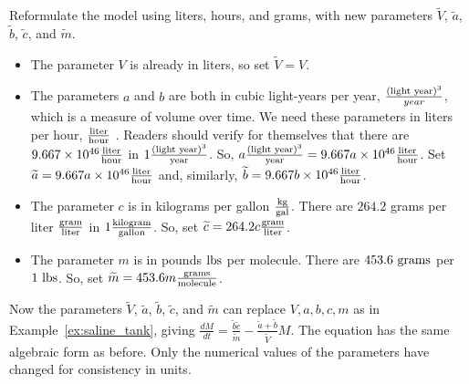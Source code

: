 \begin{example}
Reformulate the model using liters, hours, and grams, with new parameters $\widetilde{V}$, $\widetilde{a}$, $\widetilde{b}$, $\widetilde{c}$, and $\widetilde{m}$.
\begin{itemize}
\item The parameter $V$ is already in liters, so set $\widetilde{V} = V$.
\item The parameters $a$ and $b$ are both in cubic light-years per year,
$\frac{(\textup{light year})^3}{year}$,
which is a measure of volume over time. We need these parameters in liters per hour,
$\frac{\textup{liter}}{\textup{hour}}$
. Readers should verify for themselves that there are $9.667\times 10^{46} \frac{\textup{liter}}{\textup{hour}}$ in
$1 \frac{(\textup{light year})^3}{\textup{year}}$.
So, $a \frac{(\textup{light year})^3}{\textup{year}} =  9.667 a \times 10^{46} \frac{\textup{liter}}{\textup{hour}}$. Set $\widetilde{a} = 9.667a \times 10^{46} \frac{\textup{liter}}{\textup{hour}}$ and, similarly, $\widetilde{b} = 9.667b\times 10^{46} \frac{\textup{liter}}{\textup{hour}}$.
\item The parameter $c$ is in kilograms per gallon $\frac{\textup{kg}}{\textup{gal}}$. There are $264.2$ grams per liter $\frac{\textup{gram}}{\textup{liter}}$ in $1 \frac{\textup{kilogram}}{\textup{gallon}}$. So, set $\widetilde{c} = 264.2c \frac{\textup{gram}}{\textup{liter}}$.
\item The parameter $m$ is in pounds $\textup{lbs}$ per molecule. There are $453.6\textup{ grams}$ per $1\textup{ lbs}$. So, set $\widetilde{m} = 453.6m \frac{\textup{grams}}{\textup{molecule}}$.
\end{itemize} Now the parameters $\widetilde{V}$, $\widetilde{a}$, $\widetilde{b}$, $\widetilde{c}$, and $\widetilde{m}$ can replace $V, a, b, c, m$ as in Example~\ref{ex:saline_tank}, giving $\frac{dM}{dt} = \frac{\widetilde{b}\widetilde{c}}{\widetilde{m}} - \frac{\widetilde{a}+\widetilde{b}}{\widetilde{V}}M$. The equation has the same algebraic form as before. Only the numerical values of the parameters have changed for consistency in units.\\

\end{example}

